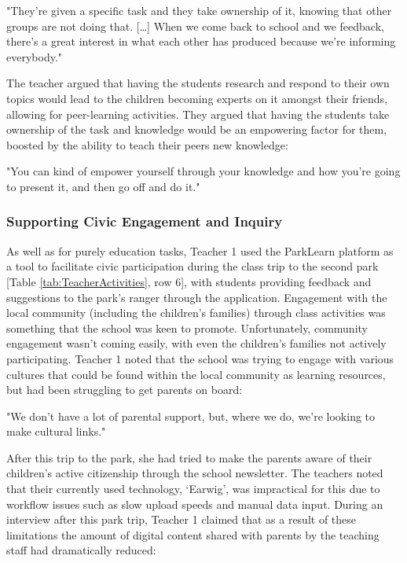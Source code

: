 \begin{displayquote}
"They’re given a specific task and they take ownership of it, knowing that other groups are not doing that. […] When we come back to school and we feedback, there’s a great interest in what each other has produced because we’re informing everybody."
\end{displayquote}

The teacher argued that having the students research and respond to their own topics would lead to the children becoming experts on it amongst their friends, allowing for peer-learning activities. They argued that having the students take ownership of the task and knowledge would be an empowering factor for them, boosted by the ability to teach their peers new knowledge:

\begin{displayquote}
"You can kind of empower yourself through your knowledge and how you’re going to present it, and then go off and do it."
\end{displayquote}


\subsubsection{Supporting Civic Engagement and Inquiry}

As well as for purely education tasks, Teacher 1 used the ParkLearn platform as a tool to facilitate civic participation during the class trip to the second park [Table \ref{tab:TeacherActivities}, row 6], with students providing feedback and suggestions to the park's ranger through the application. Engagement with the local community (including the children's families) through class activities was something that the school was keen to promote. Unfortunately, community engagement wasn't coming easily, with even the children's families not actively participating. Teacher 1 noted that the school was trying to engage with various cultures that could be found within the local community as learning resources, but had been struggling to get parents on board: 

\begin{displayquote}
"We don’t have a lot of parental support, but, where we do, we’re looking to make cultural links."
\end{displayquote}

After this trip to the park, she had tried to make the parents aware of their children’s active citizenship through the school newsletter. The teachers noted that their currently used technology, `Earwig', was impractical for this due to workflow issues such as slow upload speeds and manual data input. During an interview after this park trip, Teacher 1 claimed that as a result of these limitations the amount of digital content shared with parents by the teaching staff had dramatically reduced:

